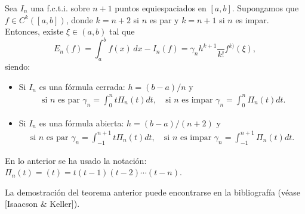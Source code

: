 \begin{theorem}
  \label{thm:error.formulas-nc}
  Sea $I_n$ una f.c.t.i. sobre $n+1$ puntos equiespaciados en
  $[a,b]$. Supongamos que $f\in C^k([a,b])$, donde $k=n+2$ si $n$ es par
  y $k=n+1$ si $n$ es impar. Entonces, existe $\xi\in(a,b)$ tal que
  \begin{equation}
  \label{eq:error-formulas-nc} 
  E_n(f)=\int_a^bf(x)\,dx - I_n(f)
    = \gamma_n h^{k+1} \frac{}{k!}f^{k)}(\xi),
  \end{equation}
  siendo:
  \begin{itemize}
  \item Si $I_n$ es una fórmula cerrada: $h=(b-a)/n$ y
    \begin{align*}
      \text{ si $n$ es par }
      \gamma_n=\int_0^n t \Pi_n(t) dt,
      \quad \text{si $n$ es impar }
          \gamma_n=\int_0^n \Pi_n(t) dt.
    \end{align*}
  \item Si $I_n$ es una fórmula abierta: $h=(b-a)/(n+2)$ y
    \begin{align*}
      \text{si $n$ es par }
      \gamma_n=\int_{-1}^{n+1} t \Pi_n(t) dt,
      \quad \text{si $n$ es impar }
      \gamma_n=\int_{-1}^{n+1} \Pi_n(t) dt.
    \end{align*}
  \end{itemize}
  En lo anterior se ha usado la notación:
  $\Pi_n(t)=(t)=t(t-1)(t-2)\cdots (t-n)$.
\end{theorem}

La demostración del teorema anterior puede encontrarse en la
bibliografía (véase [Isaacson \& Keller]).

